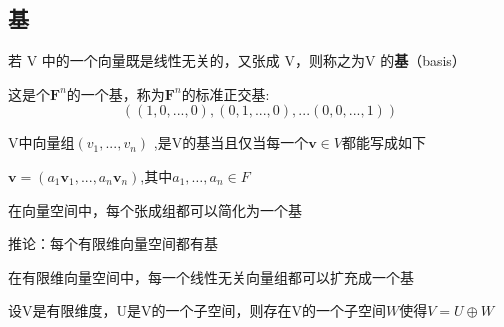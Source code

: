 \subsection{基}
\begin{definition}
若 V 中的一个向量既是线性无关的，又张成 V，则称之为V 的{\bfseries 基}（basis）
\end{definition}
这是个$\textbf{F}^n$的一个基，称为$\textbf{F}^n$的标准正交基:\\
\begin{equation*}    
\left ( \left ( 1,0,...,0 \right ) ,\left (0,1,...,0  \right ),...\left ( 0,0,...,1 \right )\right )
\end{equation*}
\begin{definition}
    V中向量组$(v_{1},...,v_{n} )$ ,是V的基当且仅当每一个$\textbf{v}\in V$都能写成如下\\
    \begin{center}
        $\textbf{v}=(a_{1}\textbf{v}_{1},...,a_{n}\textbf{v}_{n})$,其中$a_{1},…,a_{n}\in F$   
    \end{center}
\end{definition}

\begin{definition}
    在向量空间中，每个张成组都可以简化为一个基
\end{definition}
\begin{definition}
    推论：每个有限维向量空间都有基
\end{definition}
\begin{definition}
    在有限维向量空间中，每一个线性无关向量组都可以扩充成一个基
\end{definition}
\begin{definition}
    设V是有限维度，U是V的一个子空间，则存在V的一个子空间$W$使得$V=U\oplus W$
\end{definition}

